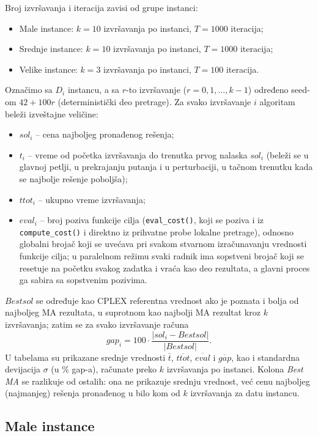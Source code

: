 \documentclass[12pt,a4paper]{article}
\begin{document}
Broj izvršavanja i iteracija zavisi od grupe instanci:
\begin{itemize}
  \item Male instance: $k = 10$ izvršavanja po instanci, $T = 1000$ iteracija;
  \item Srednje instance: $k = 10$ izvršavanja po instanci, $T = 1000$ iteracija;
  \item Velike instance: $k = 3$ izvršavanja po instanci, $T = 100$ iteracija.
\end{itemize}
Označimo sa $D_i$ instancu, a sa $r$-to izvršavanje ($r = 0, 1, \ldots, k-1$)
određeno seed-om $42 + 100r$ (deterministički deo pretrage). Za svako
izvršavanje $i$ algoritam beleži izveštajne veličine:
\begin{itemize}
  \item $sol_i$ -- cena najboljeg pronađenog rešenja;
  \item $t_i$ -- vreme od početka izvršavanja do trenutka prvog nalaska
    $sol_i$ (beleži se u glavnoj petlji, u prekrajanju putanja i u
    perturbaciji, u tačnom trenutku kada se najbolje rešenje poboljša);
  \item $ttot_i$ -- ukupno vreme izvršavanja;
  \item $eval_i$ -- broj poziva funkcije cilja (\texttt{eval\_cost()}, koji se
    poziva i iz \texttt{compute\_cost()} i direktno iz prihvatne probe lokalne
    pretrage), odnosno globalni brojač koji se uvećava pri svakom stvarnom
    izračunavanju vrednosti funkcije cilja; u paralelnom režimu svaki radnik
    ima sopstveni brojač koji se resetuje na početku svakog zadatka i vraća
    kao deo rezultata, a glavni proces ga sabira sa sopstvenim pozivima.
\end{itemize}
$Bestsol$ se određuje kao CPLEX referentna vrednost ako je poznata i bolja od
najboljeg MA rezultata, u suprotnom kao najbolji MA rezultat kroz $k$
izvršavanja; zatim se za svako izvršavanje računa
\[
  gap_i = 100 \cdot \frac{|sol_i - Bestsol|}{|Bestsol|}.
\]
U tabelama su prikazane srednje vrednosti $\bar t$, $\overline{ttot}$,
$\overline{eval}$ i $\overline{gap}$, kao i standardna devijacija $\sigma$ (u
\% gap-a), računate preko $k$ izvršavanja po instanci. Kolona \emph{Best MA} se
razlikuje od ostalih: ona ne prikazuje srednju vrednost, već cenu najboljeg
(najmanjeg) rešenja pronađenog u bilo kom od $k$ izvršavanja za datu instancu.

\subsection{Male instance}
\end{document}
